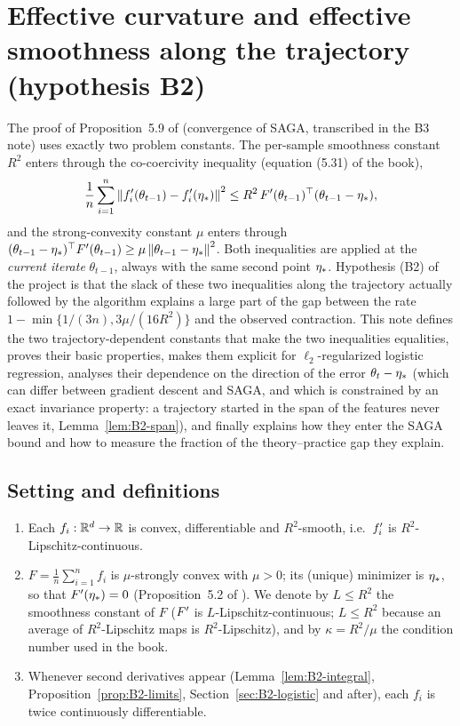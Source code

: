 \section{Effective curvature and effective smoothness along the trajectory (hypothesis B2)}
\label{sec:B2}

The proof of Proposition~5.9 of \cite{bach2024learning} (convergence of SAGA, transcribed in the B3 note)
uses exactly two problem constants. The per-sample smoothness constant $R^2$ enters through the
co-coercivity inequality (equation (5.31) of the book),
\[
\frac1n\sum_{i=1}^n \left\|f'_i(\theta_{t-1})-f'_i(\eta_\ast)\right\|^2 \le R^2\,F'(\theta_{t-1})^\top(\theta_{t-1}-\eta_\ast),
\]
and the strong-convexity constant $\mu$ enters through
$(\theta_{t-1}-\eta_\ast)^\top F'(\theta_{t-1})\ge \mu\left\|\theta_{t-1}-\eta_\ast\right\|^2$.
Both inequalities are applied at the \emph{current iterate} $\theta_{t-1}$, always with the same second
point $\eta_\ast$. Hypothesis (B2) of the project is that the slack of these two inequalities along the
trajectory actually followed by the algorithm explains a large part of the gap between the rate
$1-\min\{1/(3n),3\mu/(16R^2)\}$ and the observed contraction. This note defines the two
trajectory-dependent constants that make the two inequalities equalities, proves their basic properties,
makes them explicit for $\ell_2$-regularized logistic regression, analyses their dependence on the
direction of the error $\theta_t-\eta_\ast$ (which can differ between gradient descent and SAGA, and which is
constrained by an exact invariance property: a trajectory started in the span of the features never leaves it,
Lemma~\ref{lem:B2-span}), and finally
explains how they enter the SAGA bound and how to measure the fraction of the theory--practice gap they
explain.

\subsection{Setting and definitions}

\begin{assumption}\label{ass:B2}
\begin{enumerate}[label=(\roman*)]
\item Each $f_i:\mathbb{R}^d\to\mathbb{R}$ is convex, differentiable and $R^2$-smooth, i.e.\ $f'_i$ is $R^2$-Lipschitz-continuous.
\item $F=\frac1n\sum_{i=1}^n f_i$ is $\mu$-strongly convex with $\mu>0$; its (unique) minimizer is
$\eta_\ast$, so that $F'(\eta_\ast)=0$ (Proposition~5.2 of \cite{bach2024learning}). We denote by $L\le R^2$
the smoothness constant of $F$ ($F'$ is $L$-Lipschitz-continuous; $L\le R^2$ because an average of
$R^2$-Lipschitz maps is $R^2$-Lipschitz), and by $\kappa=R^2/\mu$ the condition number used in the book.
\item Whenever second derivatives appear (Lemma~\ref{lem:B2-integral}, Proposition~\ref{prop:B2-limits},
Section~\ref{sec:B2-logistic} and after), each $f_i$ is twice continuously differentiable.
\end{enumerate}
\end{assumption}

